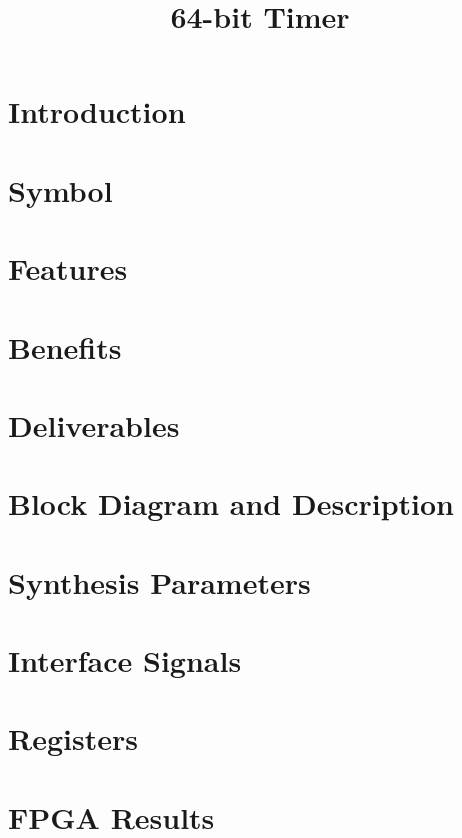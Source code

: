 \documentclass{../../submodules/TEX/document/ug/ug}
\title{64-bit Timer}
\begin{document}
\maketitle
\cleardoublepage
\tableofcontents
\listoftables
\listoffigures
\cleardoublepage

\section{Introduction}


\section{Symbol}


\section{\textcolor[rgb]{0,0,0}{Features}}

\clearpage

\section{\textcolor[rgb]{0,0,0}{Benefits}}


\section{\textcolor[rgb]{0,0,0}{Deliverables}}

\clearpage

\section{\textcolor[rgb]{0,0,0}{Block Diagram and Description}}

\clearpage

\section{\textcolor[rgb]{0,0,0}{Synthesis Parameters}}


\section{Interface Signals}


\section{Registers}


\section{\textcolor[rgb]{0,0,0}{FPGA Results}}


%
%
\end{document}
